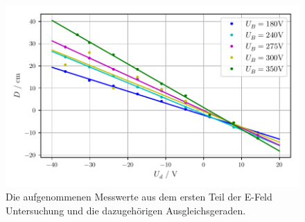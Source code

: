 \begin{figure}[H]
    \centering
    \includegraphics[width=\textwidth]{bilder/E_Feld_Teil_1.pdf}
    \caption{Die aufgenommenen Messwerte aus dem ersten Teil der E-Feld Untersuchung und die dazugehörigen Ausgleichsgeraden.}
    \label{fig:eFeldTeil1a}
\end{figure}


